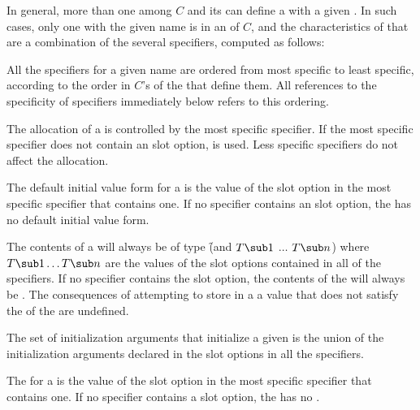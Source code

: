 In general, more than one  among $C$ and its 
 can
define a  with a given .  
In such cases, only one  with
the given name is  in an  
of $C$\negthinspace, and
the characteristics of that  are 
a combination of the several 
specifiers, computed as follows:

\beginlist

\itemitem{\bull} All the  specifiers for a given  name
are ordered from most specific to least specific, according to the order in $C$'s
 of the  that define them. All references
to the specificity of  specifiers immediately below refers to this
ordering.

\itemitem{\bull} The allocation of a  is controlled by the most 
specific  specifier.  If the most specific  specifier 
does not contain an  slot option,  is used.
Less specific  specifiers do not affect the allocation.

\itemitem{\bull} The default initial value form for a  
is the value of the  slot option in the most specific
 specifier that contains one.  If no  specifier
contains an  slot option, the  
has no default initial value form.

\itemitem{\bull} The contents of a  will always be of type 
\f{(and $T\sub 1$ $\ldots$ $T\sub n$)} where $T\sub 1 \ldots T\sub n$ are
the values of the  slot options contained in all of the
 specifiers.  If no  specifier contains the
 slot option, the contents of the  will always be 
. The consequences of attempting to store in a 
a value that does not satisfy the  of the  are undefined.

\itemitem{\bull} The set of initialization arguments that initialize a 
given  is the union of the initialization arguments declared in
the  slot options in all the  specifiers.

\itemitem{\bull} The  for a  is the value of
the  slot option in the most specific 
specifier that contains one.  If no  specifier contains a
 slot option, the  has no .

